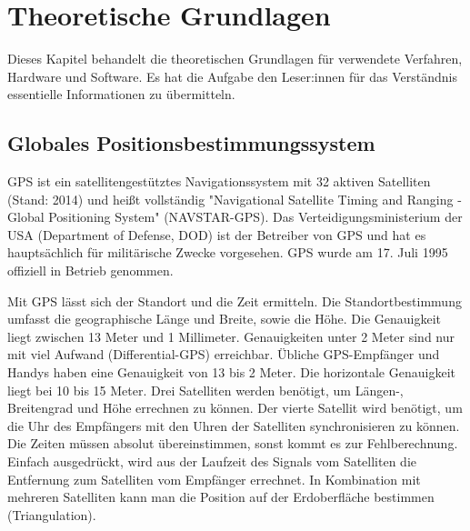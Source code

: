 \section{Theoretische Grundlagen}
\label{sec:theoretGrundl}
Dieses Kapitel behandelt die theoretischen Grundlagen für verwendete Verfahren, Hardware und Software. Es hat die Aufgabe den Leser:innen für das Verständnis essentielle Informationen zu übermitteln.
\subsection{Globales Positionsbestimmungssystem}
\label{subsec:tGPS}
\glqq GPS ist ein satellitengestütztes Navigationssystem mit 32 aktiven Satelliten (Stand: 2014) und heißt vollständig "Navigational Satellite Timing and Ranging - Global Positioning System" (NAVSTAR-GPS). Das Verteidigungsministerium der USA (Department of Defense, DOD) ist der Betreiber von GPS und hat es hauptsächlich für militärische Zwecke vorgesehen. GPS wurde am 17. Juli 1995 offiziell in Betrieb genommen.

Mit GPS lässt sich der Standort und die Zeit ermitteln. Die Standortbestimmung umfasst die geographische Länge und Breite, sowie die Höhe. Die Genauigkeit liegt zwischen 13 Meter und 1 Millimeter. Genauigkeiten unter 2 Meter sind nur mit viel Aufwand (Differential-GPS) erreichbar. Übliche GPS-Empfänger und Handys haben eine Genauigkeit von 13 bis 2 Meter. Die horizontale Genauigkeit liegt bei 10 bis 15 Meter.
Drei Satelliten werden benötigt, um Längen-, Breitengrad und Höhe errechnen zu können. Der vierte Satellit wird benötigt, um die Uhr des Empfängers mit den Uhren der Satelliten synchronisieren zu können. Die Zeiten müssen absolut übereinstimmen, sonst kommt es zur Fehlberechnung.
Einfach ausgedrückt, wird aus der Laufzeit des Signals vom Satelliten die Entfernung zum Satelliten vom Empfänger errechnet. In Kombination mit mehreren Satelliten kann man die Position auf der Erdoberfläche bestimmen (Triangulation).\grqq \ 
\cite{schnabelGPS}


